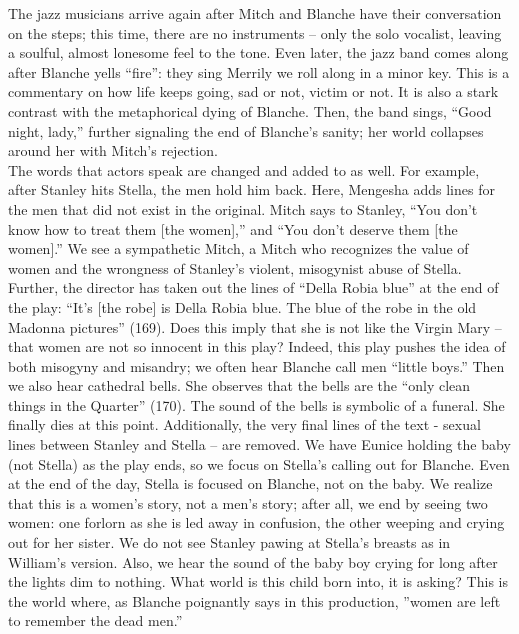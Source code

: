 \documentclass{article}
\begin{document}
\quad 
The jazz musicians arrive again after Mitch and Blanche have their conversation on the steps; this time, there are no instruments – only the solo vocalist, leaving a soulful, almost lonesome feel to the tone. Even later, the jazz band comes along after Blanche yells ``fire”: they sing Merrily we roll along in a minor key. This is a commentary on how life keeps going, sad or not, victim or not. It is also a stark contrast with the metaphorical dying of Blanche. Then, the band sings, ``Good night, lady,” further  signaling the end of Blanche’s sanity; her world collapses around her with Mitch’s rejection. \\

\qquad The words that actors speak are changed and added to as well. For example, after Stanley hits Stella, the men hold him back. Here, Mengesha adds lines for the men that did not exist in the original. Mitch says to Stanley, ``You don’t know how to treat them [the women],” and ``You don’t deserve them [the women].” We see a sympathetic Mitch, a Mitch who recognizes the value of women and the wrongness of Stanley’s violent, misogynist abuse of Stella. Further, the director has taken out the lines of ``Della Robia blue” at the end of the play: ``It’s [the robe] is Della Robia blue. The blue of the robe in the old Madonna pictures” (169). Does this imply that she is not like the Virgin Mary – that women are not so innocent in this play? Indeed, this play pushes the idea of both misogyny and misandry; we often hear Blanche call men ``little boys.” Then we also hear cathedral bells. She observes that the bells are the ``only clean things in the Quarter” (170). The sound of the bells is symbolic of a funeral. She finally dies at this point. Additionally, the very final lines of the text - sexual lines between Stanley and Stella – are removed. We have Eunice holding the baby (not Stella) as the play ends, so we focus on Stella’s calling out for Blanche. Even at the end of the day, Stella is focused on Blanche, not on the baby. We realize that this is a women’s story, not a men’s story; after all, we end by seeing two women: one forlorn as she is led away in confusion, the other weeping and crying out for her sister. We do not see Stanley pawing at Stella’s breasts as in William’s version. Also, we hear the sound of the baby boy crying for long after the lights dim to nothing. What world is this child born into, it is asking? This is the world where, as Blanche poignantly says in this production, ''women are left to remember the dead men.” \\
\end{document}
